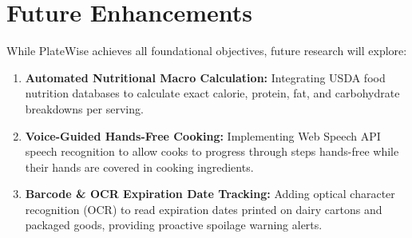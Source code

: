 \section{Future Enhancements}
While PlateWise achieves all foundational objectives, future research will explore:
\begin{enumerate}
    \item \textbf{Automated Nutritional Macro Calculation:} Integrating USDA food nutrition databases to calculate exact calorie, protein, fat, and carbohydrate breakdowns per serving.
    \item \textbf{Voice-Guided Hands-Free Cooking:} Implementing Web Speech API speech recognition to allow cooks to progress through steps hands-free while their hands are covered in cooking ingredients.
    \item \textbf{Barcode \& OCR Expiration Date Tracking:} Adding optical character recognition (OCR) to read expiration dates printed on dairy cartons and packaged goods, providing proactive spoilage warning alerts.
\end{enumerate}
